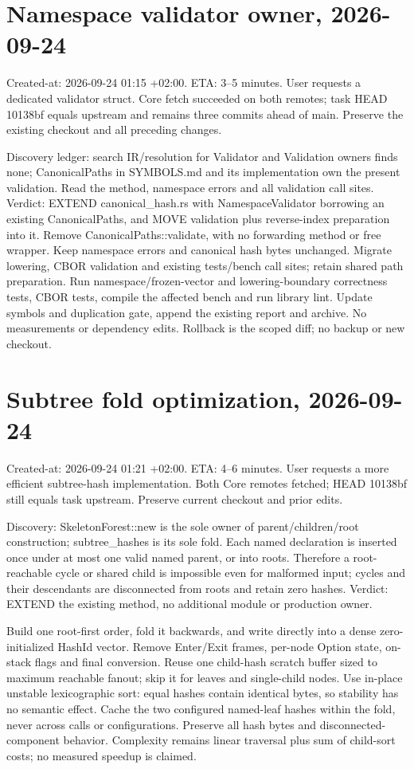 \documentclass[11pt,a4paper]{article}
\begin{document}
\section*{Namespace validator owner, 2026-09-24}
Created-at: 2026-09-24 01:15 +02:00. ETA: 3--5 minutes. User requests a
dedicated validator struct. Core fetch succeeded on both remotes; task HEAD
10138bf equals upstream and remains three commits ahead of main. Preserve
the existing checkout and all preceding changes.

Discovery ledger: search IR/resolution for Validator and Validation owners
finds none; CanonicalPaths in SYMBOLS.md and its implementation own the present
validation. Read the method, namespace errors and all validation call sites.
Verdict: EXTEND canonical\_hash.rs with NamespaceValidator borrowing an existing
CanonicalPaths, and MOVE validation plus reverse-index preparation into it.
Remove CanonicalPaths::validate, with no forwarding method or free wrapper.
Keep namespace errors and canonical hash bytes unchanged. Migrate lowering,
CBOR validation and existing tests/bench call sites; retain shared path preparation.
Run namespace/frozen-vector and lowering-boundary correctness tests, CBOR tests,
compile the affected bench and run library lint. Update symbols and duplication
gate, append the existing report and archive. No measurements or dependency edits.
Rollback is the scoped diff; no backup or new checkout.
\section*{Subtree fold optimization, 2026-09-24}
Created-at: 2026-09-24 01:21 +02:00. ETA: 4--6 minutes. User requests a more
efficient subtree-hash implementation. Both Core remotes fetched; HEAD 10138bf
still equals task upstream. Preserve current checkout and prior edits.

Discovery: SkeletonForest::new is the sole owner of parent/children/root
construction; subtree\_hashes is its sole fold. Each named declaration is
inserted once under at most one valid named parent, or into roots. Therefore
a root-reachable cycle or shared child is impossible even for malformed input;
cycles and their descendants are disconnected from roots and retain zero hashes.
Verdict: EXTEND the existing method, no additional module or production owner.

Build one root-first order, fold it backwards, and write directly into a dense
zero-initialized HashId vector. Remove Enter/Exit frames, per-node Option state,
on-stack flags and final conversion. Reuse one child-hash scratch buffer sized
to maximum reachable fanout; skip it for leaves and single-child nodes. Use
in-place unstable lexicographic sort: equal hashes contain identical bytes, so
stability has no semantic effect. Cache the two configured named-leaf hashes
within the fold, never across calls or configurations. Preserve all hash bytes
and disconnected-component behavior. Complexity remains linear traversal plus
sum of child-sort costs; no measured speedup is claimed.
\end{document}
